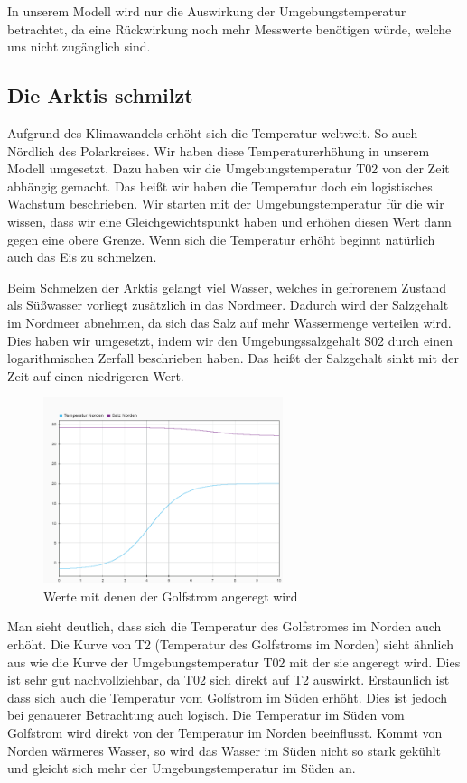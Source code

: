 \documentclass[a4paper,twoside]{article}
\begin{document}
	In unserem Modell wird nur die Auswirkung der Umgebungstemperatur betrachtet, da eine Rückwirkung noch mehr Messwerte benötigen würde, welche uns nicht zugänglich sind.  
	

	\subsection{Die Arktis schmilzt} \label{dieArktisSchmilzt}
	
	Aufgrund des Klimawandels erhöht sich die Temperatur weltweit. So auch Nördlich des Polarkreises. Wir haben diese Temperaturerhöhung in unserem Modell umgesetzt. Dazu haben wir die Umgebungstemperatur T02 von der Zeit abhängig gemacht. Das heißt wir haben die Temperatur doch ein logistisches Wachstum beschrieben. Wir starten mit der Umgebungstemperatur für die wir wissen, dass wir eine Gleichgewichtspunkt haben und erhöhen diesen Wert dann gegen eine obere Grenze. Wenn sich die Temperatur erhöht beginnt natürlich auch das Eis zu schmelzen.
		
	Beim Schmelzen der Arktis gelangt viel Wasser, welches in gefrorenem Zustand als Süßwasser vorliegt zusätzlich in das Nordmeer. Dadurch wird der Salzgehalt im Nordmeer abnehmen, da sich das Salz auf mehr Wassermenge verteilen wird. Dies haben wir umgesetzt, indem wir den Umgebungssalzgehalt S02 durch einen logarithmischen Zerfall beschrieben haben. Das heißt der Salzgehalt sinkt mit der Zeit auf einen niedrigeren Wert. 
	
	\begin{figure}[!h]
  		\centering
 		\includegraphics[width=7cm]{../Diagramme/Arktis_schmilzt_init.png}
  		\caption{Werte mit denen der Golfstrom angeregt wird}
  		\label{fig:schmilztUmgebung}
	\end{figure}

	Man sieht deutlich, dass sich die Temperatur des Golfstromes im Norden auch erhöht. Die Kurve von T2 (Temperatur des Golfstroms im Norden) sieht ähnlich aus wie die Kurve der Umgebungstemperatur T02 mit der sie angeregt wird. Dies ist sehr gut nachvollziehbar, da T02 sich direkt auf T2 auswirkt. Erstaunlich ist dass sich auch die Temperatur vom Golfstrom im Süden erhöht. Dies ist jedoch bei genauerer Betrachtung auch logisch. Die Temperatur im Süden vom Golfstrom wird direkt von der Temperatur im Norden beeinflusst. Kommt von Norden wärmeres Wasser, so wird das Wasser im Süden nicht so stark gekühlt und gleicht sich mehr der Umgebungstemperatur im Süden an.
	
\end{document}
